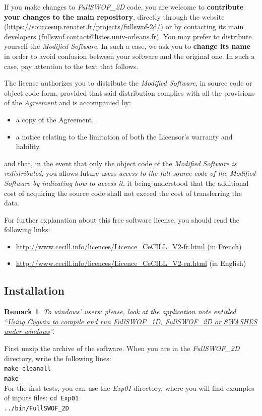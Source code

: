 \documentclass[a4paper, 11pt]{article}
\makeatletter
\newcommand{\FullSWOF}{\emph{FullSWOF\_2D}}
\newcommand{\contactFS}{\href{mailto:fullswof.contact@listes.univ-orleans.fr}{fullswof.contact@listes.univ-orleans.fr}}
\newcommand{\MainWebSite}{\url{https://sourcesup.renater.fr/projects/fullswof-2d/}}
\newtheorem{rmk}{Remark}
\makeatother
\begin{document}
If you make changes to \FullSWOF{} code, you are welcome to \textbf{contribute your changes to the main repository}, directly through the website (\MainWebSite) or by contacting its main developers (\contactFS).
You may prefer to distribute yourself the \emph{Modified Software}. In such a case, we ask you to \textbf{change its name} in order to avoid confusion between your software and the original one. In such a case, pay attention to the text that follows.

The license authorizes you to distribute the \emph{Modified Software}, in source code or object code form, provided that said distribution complies with all the provisions of the \emph{Agreement} and is accompanied by:
\begin{itemize}
\item a copy of the Agreement,
\item a notice relating to the limitation of both the Licensor's warranty and liability,
\end{itemize}
and that, in the event that only the object code of the \emph{Modified Software is redistributed}, you allows future users \emph{access to the full source code of the Modified Software by indicating how to access it}, it being understood that the additional cost of acquiring the source code shall not exceed the cost of transferring the data.

For further explanation about this free software license, you should read the following links:
\begin{itemize}
\item \url{http://www.cecill.info/licences/Licence\_CeCILL\_V2-fr.html} (in French)
\item \url{http://www.cecill.info/licences/Licence\_CeCILL\_V2-en.html} (in English)
\end{itemize}

\subsection{Installation}
\begin{rmk}
To windows' users: please, look at the application note entitled ``\href{https://sourcesup.renater.fr/docman/view.php/895/3949/AppNote-windows.pdf}{Using Cygwin to compile and run  \emph{FullSWOF\_1D}, \FullSWOF{} or \emph{SWASHES} under windows}''.
\end{rmk}

First unzip the archive of the software. 
When you are in the \FullSWOF{} directory, write the following lines:\\
\verb!make cleanall!\\
\verb!make!\\
For the first tests, you can use the \textit{Exp01} directory, where you will find examples of inputs files:
\verb!cd Exp01!\\
\verb!../bin/FullSWOF_2D !
\end{document}
